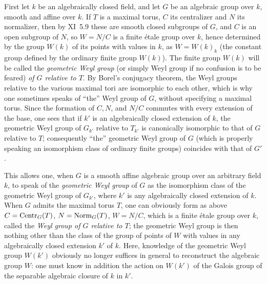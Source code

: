 First let $k$ be an algebraically closed field, and let $G$ be an algebraic group over $k$, smooth and affine over $k$. If $T$ is a maximal torus, $C$ its centralizer and $N$ its normalizer, then by XI~5.9 these are smooth closed subgroups of $G$, and $C$ is an open subgroup of $N$, so $W=N/C$ is a finite étale group over $k$, hence determined by the group $W(k)$ of its points with values in $k$, as $W=W(k)_k$ (the constant group defined by the ordinary finite group $W(k)$). The finite group $W(k)$ will be called the \emph{geometric Weyl group} (or simply Weyl group if no confusion is to be feared) \emph{of $G$ relative to $T$}. By Borel's conjugacy theorem, the Weyl groups relative to the various maximal tori are isomorphic to each other, which is why one sometimes speaks of ``the'' Weyl group of $G$, without specifying a maximal torus. Since the formation of $C,N$, and $N/C$ commutes with every extension of the base, one sees that if $k'$ is an algebraically closed extension of $k$, the geometric Weyl group of $G_{k'}$ relative to $T_{k'}$ is canonically isomorphic to that of $G$ relative to $T$; consequently ``the'' geometric Weyl group of $G$ (which is properly speaking an isomorphism class of ordinary finite groups) coincides with that of $G'$.

This allows one, when $G$ is a smooth affine algebraic group over an arbitrary field $k$, to speak of the \emph{geometric Weyl group} of $G$ as the isomorphism class of the geometric Weyl group of $G_{k'}$, where $k'$ is any algebraically closed extension of $k$. When $G$ admits the maximal torus $T$, one can obviously form as above $C=\operatorname{Centr}_G(T)$, $N=\operatorname{Norm}_G(T)$, $W=N/C$, which is a finite étale group over $k$, called the \emph{Weyl group of $G$ relative to $T$}; the geometric Weyl group is then nothing other than the class of the group of points of $W$ with values in any algebraically closed extension $k'$ of $k$. Here, knowledge of the geometric Weyl group $W(k')$ obviously no longer suffices in general to reconstruct the algebraic group $W$: one must know in addition the action on $W(k')$ of the Galois group of the separable algebraic closure of $k$ in $k'$.

